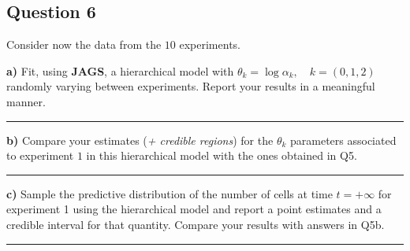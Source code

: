 \subsection*{Question 6}

Consider now the data from the $10$ experiments.

\textbf{a)} Fit, using \textbf{JAGS}, a hierarchical model with $\theta_k = \log{\alpha_k}, \quad k = (0, 1, 2)$ randomly varying between experiments. Report your results in a meaningful manner.

\begin{center}\rule{6cm}{0.4pt}\end{center}

\textbf{b)} Compare your estimates (\textit{+ credible regions}) for the $\theta_k$ parameters associated to experiment $1$ in this hierarchical model with the ones obtained in Q5.

\begin{center}\rule{6cm}{0.4pt}\end{center}

\textbf{c)} Sample the predictive distribution of the number of cells at time $t = +\infty$ for experiment 1 using the hierarchical model and report a point estimates and a credible interval for that quantity. Compare your results with answers in Q5b.

\begin{center}\rule{6cm}{0.4pt}\end{center}